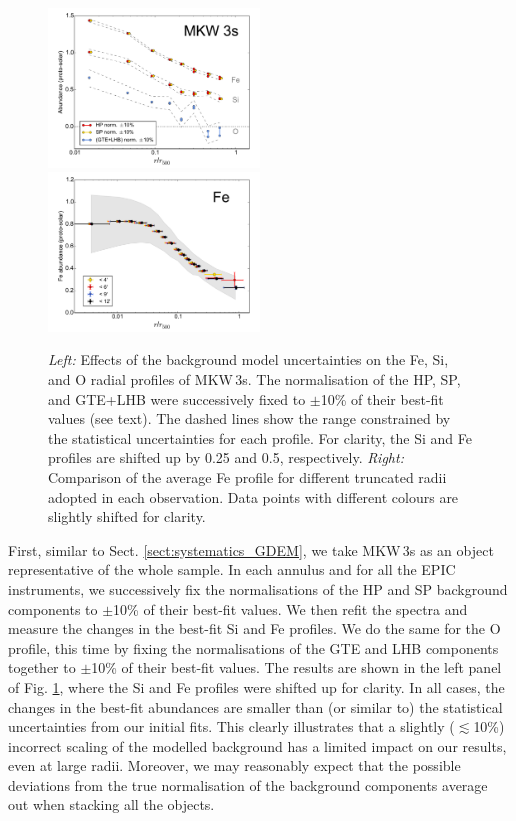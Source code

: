 \documentclass{aa}
\begin{document}
\begin{figure}[!]

                \includegraphics[width=0.5\textwidth]{fig_MKW3s_bg.pdf}
                \includegraphics[width=0.5\textwidth]{fig_profiles_truncated_annuli.pdf}

        \caption{\textit{Left:} Effects of the background model uncertainties on the Fe, Si, and O radial profiles of MKW\,3s. The normalisation of the HP, SP, and GTE+LHB were successively fixed to $\pm$10\% of their best-fit values (see text). The dashed lines show the range constrained by the statistical uncertainties for each profile. For clarity, the Si and Fe profiles are shifted up by 0.25 and 0.5, respectively. \textit{Right:} Comparison of the average Fe profile for different truncated radii adopted in each observation. Data points with different colours are slightly shifted for clarity.}
\label{fig:systematics_bg}
\end{figure}


First, similar to Sect. \ref{sect:systematics_GDEM}, we take MKW\,3s as an object representative of the whole sample. In each annulus and for all the EPIC instruments, we successively fix the normalisations of the HP and SP background components to $\pm$10\% of their best-fit values. We then refit the spectra and measure the changes in the best-fit Si and Fe profiles. We do the same for the O profile, this time by fixing the normalisations of the GTE and  LHB components together to $\pm$10\% of their best-fit values. The results are shown in the left panel of Fig. \ref{fig:systematics_bg}, where the Si and Fe profiles were shifted up for clarity. In all cases, the changes in the best-fit abundances are smaller than (or similar to) the statistical uncertainties from our initial fits. This clearly illustrates that a slightly ($\lesssim$10\%) incorrect scaling of the modelled background has a limited impact on our results, even at large radii. Moreover, we may reasonably expect that the possible deviations from the true normalisation of the background components average out when stacking all the objects. 
\end{document}
